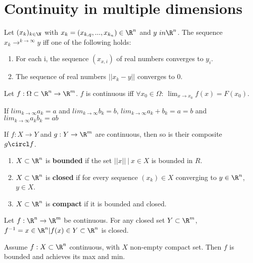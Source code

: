 \chapter{Continuity in multiple dimensions}

\begin{definition}[Convergence in $R^n$]
	Let $(x_k)_{k \in \N}$ with $x_k = (x_{k,q},...,x_{k_n}) \in \R^n$ and $y \ in \R^n$. 
	The sequence $x_k \to^{k\to\infty} y$ iff one of the following holds:
	\begin{enumerate}
		\item For each i, the sequence $(x_{x,i})$ of real numbers converges to $y_i$.
		\item The sequence of real numbers $||x_k - y||$ converges to 0.
	\end{enumerate}
\end{definition}

\begin{definition}[Continuity]
	Let $f: \Omega \subset \R^n \to \R^m$.
	$f$ is continuous iff $\forall x_0 \in \Omega: \ \lim_{x \to x_0} f(x) = F(x_0)$.
\end{definition}

\begin{theorem}
	If $lim_{k \to \infty}a_k = a$ and  $lim_{k \to \infty} b_k = b$, $lim_{k \to \infty}a_k+b_k = a=b$ and  $lim_{k \to \infty}a_kb_k = ab$ 
\end{theorem}

\begin{proposition}
	If $f: X \to Y$ and $g: Y \to \R^m$ are continuous, then so is their composite $g \circl f$.
\end{proposition}

\begin{definition}
	\begin{enumerate}
		\item $X \subset \R^n$ is \textbf{bounded} if the set ${||x|| \ | \ x \in X}$ is bounded in $R$.
		\item $X \subset \R^n$ is \textbf{closed} if for every sequence $(x_k) \in X$ converging to $y \in \R^n$, $y \in X$.
		\item $X \subset \R^n$ is \textbf{compact} if it is bounded and closed.
	\end{enumerate}
\end{definition}

\begin{proposition}
	Let $f: \R^n \to \R^m$ be continuous.
	For any closed set $Y \subset \R^m$, $f^{-1} = {x\in \R^n | f(x) \in Y} \subset \R^n$ is closed.
\end{proposition}

\begin{theorem}
	Assume $f: X \subset \R^n$ continuous, with $X$ non-empty compact set.
	Then $f$ is bounded and achieves its max and min.
\end{theorem}
